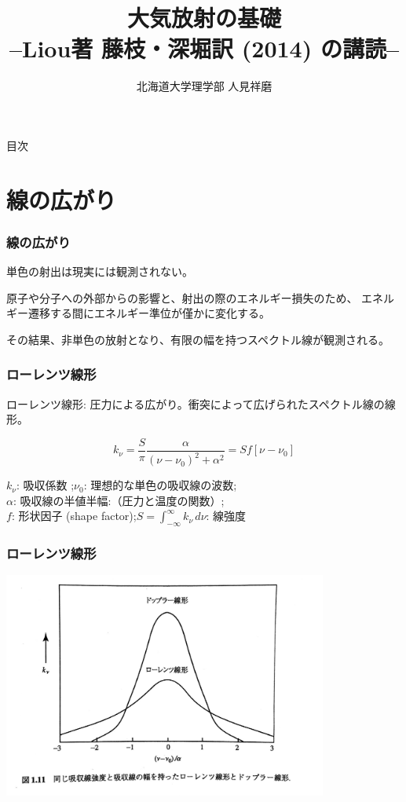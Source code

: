 \documentclass[unicode,colorlinks]{beamer}
\title{大気放射の基礎\\--Liou著 藤枝・深堀訳 (2014) の講読--}
\author{北海道大学理学部 人見祥磨}
\date{\warekitoday}
\newcommand{\centeralign}[1]{\rule{0pt}{0pt}\hfill#1\hfill\rule{0pt}{0pt}}
\begin{document}
\maketitle

\begin{frame}{目次}
	\tableofcontents
\end{frame}

\section{線の広がり}

\begin{frame}
	\frametitle{線の広がり}
	単色の射出は現実には観測されない。

	原子や分子への外部からの影響と、射出の際のエネルギー損失のため、
	エネルギー遷移する間にエネルギー準位が僅かに変化する。

	その結果、非単色の放射となり、有限の幅を持つスペクトル線が観測される。
\end{frame}

\begin{frame}
	\frametitle{ローレンツ線形}
	ローレンツ線形: 圧力による広がり。衝突によって広げられたスペクトル線の線形。

	\[k_\nu=\frac{S}{\pi}\frac{\alpha}{(\nu-\nu_0)^2+\alpha^2}=Sf[\nu-\nu_0]\]

	$k_\nu$: 吸収係数 ;\quad $\nu_0$: 理想的な単色の吸収線の波数;\\
	$\alpha$: 吸収線の半値半幅:（圧力と温度の関数）;\\
	$f$: 形状因子 (shape factor);\quad $\displaystyle S=\int^\infty_{-\infty}k_\nu\,d\nu$: 線強度
\end{frame}

\begin{frame}
	\frametitle{ローレンツ線形}
	\centeralign{\includegraphics[width=0.8\textwidth]{lorentz.jpg}}
\end{frame}
\end{document}
